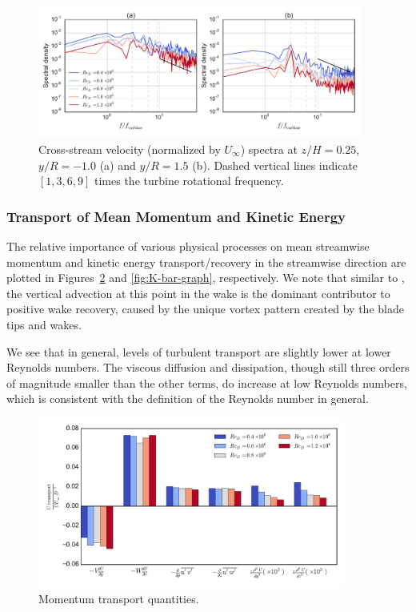 \documentclass[energies,article,accept,moreauthors,pdftex,12pt,a4paper]{mdpi}
\begin{document}
\begin{figure}[ht]
\centering
\includegraphics[width=0.95\textwidth]{figures/wake_spectra}
\caption{Cross-stream velocity (normalized by $U_\infty$) spectra at $z/H=0.25$, 
$y/R=-1.0$ (a) and $y/R=1.5$ (b). Dashed vertical
lines indicate $[1, 3, 6, 9]$ times the turbine rotational frequency.}
\label{fig:wake-spectra}
\end{figure}



\subsubsection{Transport of Mean Momentum and Kinetic Energy}

The relative importance of various physical processes on mean streamwise
momentum and kinetic energy transport/recovery in the streamwise direction are
plotted in Figures~\ref{fig:mom-bar-graph} and \ref{fig:K-bar-graph},
respectively. We note that similar to \cite{Bachant2015-JoT}, the vertical
advection at this point in the wake is the dominant contributor to positive wake
recovery, caused by the unique vortex pattern created by the blade tips and
wakes.

We see that in general, levels of turbulent transport are slightly lower at
lower Reynolds numbers. The viscous diffusion and dissipation, though still
three orders of magnitude smaller than the other terms, do increase at low
Reynolds numbers, which is consistent with the definition of the Reynolds number
in general.


\begin{figure}[ht]
\centering
\includegraphics[width=0.9\textwidth]{figures/mom_bar_graph}
\caption{Momentum transport quantities.}
\label{fig:mom-bar-graph}
\end{figure}
\end{document}
